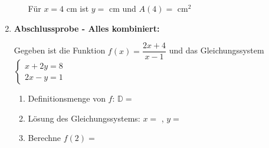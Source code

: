 \begin{enumerate}[label=\arabic*., resume]
\begin{enumerate}[label=\alph*)]
        Für $x = 4$ cm ist $y =$ \underline{\hspace{2cm}} cm und $A(4) =$ \underline{\hspace{2cm}} cm$^2$
    \end{enumerate}

    \vspace{1cm}

    \item \textbf{Abschlussprobe - Alles kombiniert:}
    \vspace{0.5cm}

    Gegeben ist die Funktion $f(x) = \dfrac{2x + 4}{x - 1}$ und das Gleichungssystem $\begin{cases} x + 2y = 8 \\ 2x - y = 1 \end{cases}$

    \begin{enumerate}[label=\alph*)]
        \item Definitionsmenge von $f$: $\mathbb{D} =$ \underline{\hspace{3cm}}
        \vspace{0.3cm}
        \item Lösung des Gleichungssystems: $x =$ \underline{\hspace{1.5cm}}, $y =$ \underline{\hspace{1.5cm}}
        \vspace{0.3cm}
        \item Berechne $f(2) =$ \underline{\hspace{2cm}}
    \end{enumerate}

\end{enumerate}
